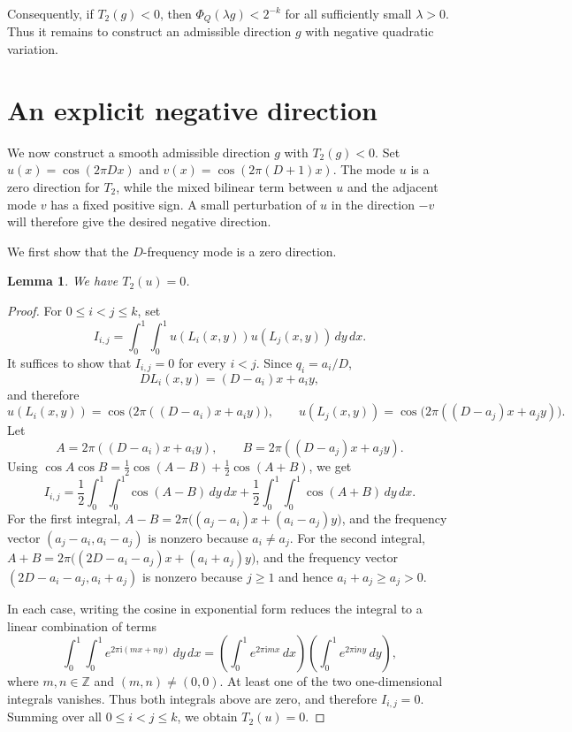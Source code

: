 \documentclass[twoside,12pt]{article}
\newcommand{\Z}{\mathbb{Z}}
\newcommand{\1}{\mathbf 1}
\newtheorem{lemma}{Lemma}[section]
\begin{document}
Consequently, if \(T_2(g)<0\), then \(\Phi_Q(\lambda g)<2^{-k}\) for all
sufficiently small \(\lambda>0\).  Thus it remains to construct an admissible
direction \(g\) with negative quadratic variation.

\section{An explicit negative direction}
\label{sec:negative-direction}

We now construct a smooth admissible direction \(g\) with \(T_2(g)<0\).  Set
\(u(x)=\cos(2\pi D x)\) and \(v(x)=\cos(2\pi(D+1)x)\).  The mode \(u\) is a
zero direction for \(T_2\), while the mixed bilinear term between \(u\) and the
adjacent mode \(v\) has a fixed positive sign.  A small perturbation of \(u\)
in the direction \(-v\) will therefore give the desired negative direction.

We first show that the \(D\)-frequency mode is a zero direction.

\begin{lemma}\label{lem:T2u-zero}
We have \(T_2(u)=0\).
\end{lemma}


\begin{proof}
For \(0\le i<j\le k\), set
\[
I_{i,j}
=
\int_0^1\!\int_0^1
u(L_i(x,y))u(L_j(x,y))\,dy\,dx.
\]
It suffices to show that \(I_{i,j}=0\) for every \(i<j\).  Since
\(q_i=a_i/D\),
\[
D L_i(x,y)=(D-a_i)x+a_i y,
\]
and therefore
\[
u(L_i(x,y))=\cos\bigl(2\pi((D-a_i)x+a_i y)\bigr),
\qquad
u(L_j(x,y))=\cos\bigl(2\pi((D-a_j)x+a_j y)\bigr).
\]
Let
\[
A=2\pi((D-a_i)x+a_i y),
\qquad
B=2\pi((D-a_j)x+a_j y).
\]
Using \(\cos A\cos B=\frac12\cos(A-B)+\frac12\cos(A+B)\), we get
\[
I_{i,j}
=
\frac12\int_0^1\!\int_0^1\cos(A-B)\,dy\,dx
+
\frac12\int_0^1\!\int_0^1\cos(A+B)\,dy\,dx.
\]
For the first integral,
$A-B=2\pi\bigl((a_j-a_i)x+(a_i-a_j)y\bigr)$,
and the frequency vector \((a_j-a_i,a_i-a_j)\) is nonzero because
\(a_i\ne a_j\).  For the second integral,
$A+B=2\pi\bigl((2D-a_i-a_j)x+(a_i+a_j)y\bigr)$,
and the frequency vector \((2D-a_i-a_j,a_i+a_j)\) is nonzero because
\(j\ge1\) and hence \(a_i+a_j\ge a_j>0\).

In each case, writing the cosine in exponential form reduces the integral to
a linear combination of terms
\[
\int_0^1\!\int_0^1 e^{2\pi \mathrm i(mx+ny)}\,dy\,dx
=
\left(\int_0^1e^{2\pi \mathrm i m x}\,dx\right)
\left(\int_0^1e^{2\pi \mathrm i n y}\,dy\right),
\]
where \(m,n\in\Z\) and \((m,n)\ne(0,0)\).  At least one of the two
one-dimensional integrals vanishes.  Thus both integrals above are zero, and
therefore \(I_{i,j}=0\).  Summing over all \(0\le i<j\le k\), we obtain
\(T_2(u)=0\).
\end{proof}
\end{document}
